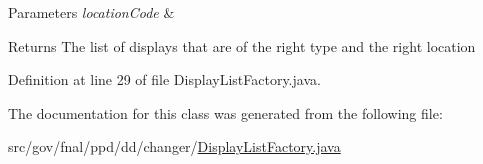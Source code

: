 \begin{DoxyParams}{Parameters}
{\em location\-Code} & \\
\hline
\end{DoxyParams}
\begin{DoxyReturn}{Returns}
The list of displays that are of the right type and the right location 
\end{DoxyReturn}


Definition at line 29 of file Display\-List\-Factory.\-java.



The documentation for this class was generated from the following file\-:\begin{DoxyCompactItemize}
\item 
src/gov/fnal/ppd/dd/changer/\hyperlink{DisplayListFactory_8java}{Display\-List\-Factory.\-java}\end{DoxyCompactItemize}
